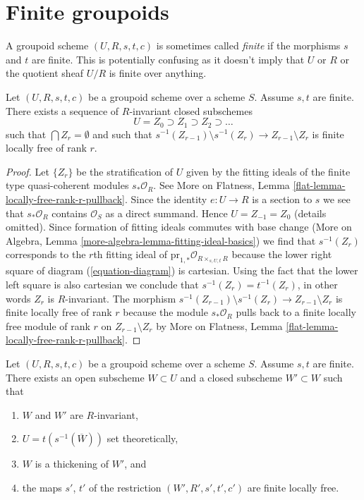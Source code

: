 \section{Finite groupoids}
\label{section-finite-groupoids}

\noindent
A groupoid scheme $(U, R, s, t, c)$ is sometimes called {\it finite} if the
morphisms $s$ and $t$ are finite. This is potentially confusing as it doesn't
imply that $U$ or $R$ or the quotient sheaf $U/R$ is finite over anything.

\begin{lemma}
\label{lemma-finite-stratify}
Let $(U, R, s, t, c)$ be a groupoid scheme over a scheme $S$. Assume $s, t$
are finite. There exists a sequence of $R$-invariant closed subschemes
$$
U = Z_0 \supset Z_1 \supset Z_2 \supset \ldots
$$
such that $\bigcap Z_r = \emptyset$ and such that
$s^{-1}(Z_{r - 1}) \setminus s^{-1}(Z_r) \to Z_{r - 1} \setminus Z_r$
is finite locally free of rank $r$.
\end{lemma}

\begin{proof}
Let $\{Z_r\}$ be the stratification of $U$ given by the fitting ideals
of the finite type quasi-coherent modules $s_*\mathcal{O}_R$. See
More on Flatness, Lemma \ref{flat-lemma-locally-free-rank-r-pullback}.
Since the identity $e : U \to R$ is a section to $s$ we see that
$s_*\mathcal{O}_R$ contains $\mathcal{O}_S$ as a direct summand.
Hence $U = Z_{-1} = Z_0$ (details omitted).
Since formation of fitting ideals commutes with base change
(More on Algebra, Lemma \ref{more-algebra-lemma-fitting-ideal-basics})
we find that $s^{-1}(Z_r)$ corresponds to the $r$th fitting ideal
of $\text{pr}_{1, *}\mathcal{O}_{R \times_{s, U, t} R}$ because
the lower right square of diagram (\ref{equation-diagram}) is cartesian.
Using the fact that the lower left square is also cartesian we conclude
that $s^{-1}(Z_r) = t^{-1}(Z_r)$, in other words $Z_r$ is $R$-invariant.
The morphism
$s^{-1}(Z_{r - 1}) \setminus s^{-1}(Z_r) \to Z_{r - 1} \setminus Z_r$
is finite locally free of rank $r$ because the module
$s_*\mathcal{O}_R$ pulls back to a finite locally free module of rank $r$
on $Z_{r - 1} \setminus Z_r$ by
More on Flatness, Lemma \ref{flat-lemma-locally-free-rank-r-pullback}.
\end{proof}

\begin{lemma}
\label{lemma-finite-flat-over-almost-dense-subscheme}
Let $(U, R, s, t, c)$ be a groupoid scheme over a scheme $S$. Assume $s, t$
are finite. There exists an open subscheme $W \subset U$ and a closed
subscheme $W' \subset W$ such that
\begin{enumerate}
\item $W$ and $W'$ are $R$-invariant,
\item $U = t(s^{-1}(\overline{W}))$ set theoretically,
\item $W$ is a thickening of $W'$, and
\item the maps $s'$, $t'$ of the restriction $(W', R', s', t', c')$
are finite locally free.
\end{enumerate}
\end{lemma}

